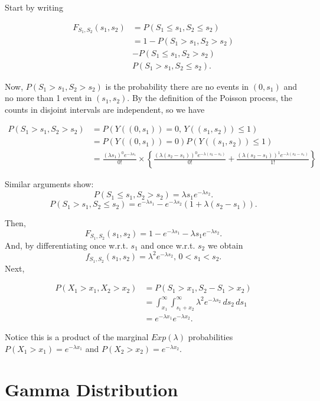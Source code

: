 \documentclass[]{book}
\begin{document}
Start by writing

\begin{align*}
F_{S_1, S_2}(s_1, s_2) &= P(S_1 \leq s_1, S_2 \leq s_2)\\
& = 1 - P(S_1 > s_1, S_2 > s_2) \\
&- P(S_1 \leq s_1, S_2 > s_2)\\
&P(S_1 > s_1, S_2 \leq s_2).
\end{align*}

Now, \(P(S_1 > s_1, S_2 > s_2)\) is the probability there are no events
in \((0,s_1)\) and no more than 1 event in \((s_1, s_2)\). By the
definition of the Poisson process, the counts in disjoint intervals are
independent, so we have

\begin{align*}
P(S_1 > s_1, S_2 > s_2) & = P(Y((0, s_1)) = 0, \, Y((s_1, s_2))\leq 1)\\
& = P(Y((0, s_1)) = 0)P(Y((s_1, s_2))\leq 1)\\
& = \frac{(\lambda s_1)^0e^{-\lambda s_1}}{0!}\times\left\{ \frac{(\lambda (s_2-s_1))^0e^{-\lambda (s_2-s_1)}}{0!}+ \frac{(\lambda (s_2-s_1))^1e^{-\lambda (s_2-s_1)}}{1!}\right\}
\end{align*}

Similar arguments show:
\[P(S_1 \leq s_1, S_2 > s_2) = \lambda s_1 e^{-\lambda s_2}.\]
\[P(S_1 > s_1, S_2 \leq s_2) = e^{-\lambda s_1} - e^{-\lambda s_2}(1+\lambda(s_2 - s_1)).\]

Then,
\[F_{S_1, S_2}(s_1, s_2) = 1-e^{-\lambda s_1} - \lambda s_1 e^{-\lambda s_2}.\]
And, by differentiating once w.r.t. \(s_1\) and once w.r.t. \(s_2\) we
obtain
\[f_{S_1, S_2}(s_1, s_2) = \lambda^2e^{-\lambda s_2}, \, 0<s_1<s_2.\]
Next,

\begin{align*}
P(X_1 > x_1, X_2 > x_2) &= P(S_1 > x_1, S_2-S_1 > x_2)\\
& = \int_{x_1}^\infty \int_{s_1 + x_2}^\infty \lambda^2 e^{-\lambda s_2}\,ds_2\,ds_1\\
& = e^{-\lambda x_1}e^{-\lambda x_2}.
\end{align*}

Notice this is a product of the marginal \(Exp(\lambda)\) probabilities
\(P(X_1 > x_1) = e^{-\lambda x_1}\) and
\(P(X_2 > x_2) = e^{-\lambda x_2}\).

\section{Gamma Distribution}\label{gamma-distribution}
\end{document}
